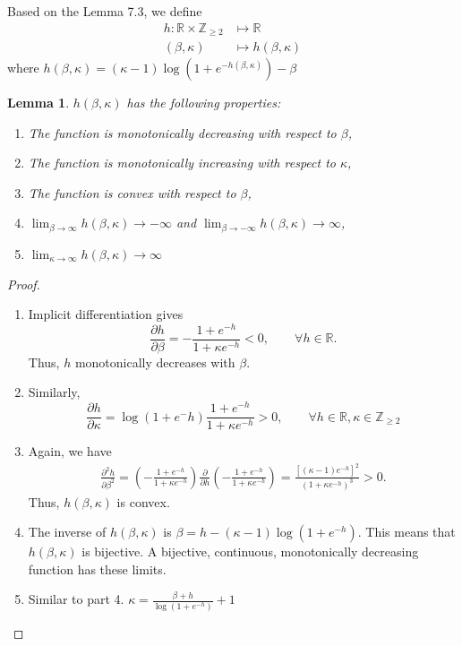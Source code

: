 \documentclass[12pt]{article}
\newtheorem{lemma}[theorem]{Lemma}
\numberwithin{equation}{section}
\begin{document}
Based on the Lemma 7.3, we define
\begin{align*}
    h: \mathbb{R} \times \mathbb{Z}_{\geq 2} & \mapsto \mathbb{R}       \\
    (\beta, \kappa)                          & \mapsto h(\beta, \kappa)
\end{align*}
where $h(\beta, \kappa) = (\kappa - 1)\log (1+e^{-h(\beta, \kappa)}) - \beta$

\begin{lemma}
    $h(\beta, \kappa)$ has the following properties:
    \begin{enumerate}
        \item The function is monotonically decreasing with respect to $\beta$,
        \item The function is monotonically increasing with respect to $\kappa$,
        \item The function is convex with respect to $\beta$,
        \item $\lim_{\beta\rightarrow\infty} h(\beta, \kappa) \rightarrow -\infty$ and $\lim_{\beta\rightarrow-\infty} h(\beta, \kappa) \rightarrow \infty$,
        \item $\lim_{\kappa\rightarrow\infty} h(\beta, \kappa) \rightarrow \infty$
    \end{enumerate}
\end{lemma}

\begin{proof}
    \begin{enumerate}
        \item Implicit differentiation gives
              \begin{equation*}
                  \frac{\partial h}{\partial\beta} = -\frac{1+e^{-h}}{1+\kappa e^{-h}} < 0, \qquad \forall h\in \mathbb{R}.
              \end{equation*}
              Thus, $h$ monotonically decreases with $\beta$.
        \item Similarly,
              \begin{equation*}
                  \frac{\partial h}{\partial \kappa} = \log(1+e^-h)\frac{1+e^{-h}}{1+\kappa e^{-h}} > 0, \qquad \forall h\in \mathbb{R}, \kappa\in\mathbb{Z}_{\geq 2}
              \end{equation*}
        \item Again, we have
              \begin{align*}
                  \frac{\partial^2h}{\partial\beta^2} = \left(-\frac{1+e^{-h}}{1+\kappa e^{-h}}\right)\frac{\partial}{\partial h}\left(-\frac{1+e^{-h}}{1+\kappa e^{-h}}\right) = \frac{[(\kappa-1)e^{-h}]^2}{(1+\kappa e^{-h})^3} > 0 .
              \end{align*}
              Thus, $h(\beta,\kappa)$ is convex.
        \item The inverse of $h(\beta, \kappa)$ is $\beta = h-(\kappa-1)\log(1+e^{-h})$. This means that $h(\beta,\kappa)$ is bijective.
              A bijective, continuous, monotonically decreasing function has these limits.
        \item Similar to part 4. $\kappa = \frac{\beta+h}{\log(1+e^{-h})} + 1$
    \end{enumerate}
\end{proof}
\end{document}
